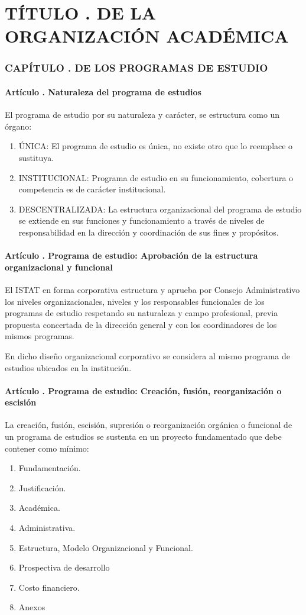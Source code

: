 \part{TÍTULO . DE LA ORGANIZACIÓN ACADÉMICA}
\addtocounter{ns}{1}
\section{CAPÍTULO . DE LOS PROGRAMAS DE ESTUDIO}
\addtocounter{re}{1}
\subsection{Artículo . Naturaleza del programa de estudios}
\addtocounter{ns}{1}
El programa de estudio por su naturaleza y carácter, se estructura como un órgano: 
\begin{enumerate}
\item ÚNICA: El programa de estudio es única, no existe otro que lo reemplace o sustituya. 
\item INSTITUCIONAL: Programa de estudio en su funcionamiento, cobertura o competencia es de carácter institucional. 
\item DESCENTRALIZADA: La estructura organizacional del programa de estudio se extiende en sus funciones y funcionamiento a través de niveles de responsabilidad en la dirección y coordinación de sus fines y propósitos. 
\end{enumerate}
\subsection{Artículo . Programa de estudio: Aprobación de la estructura organizacional y funcional}
\addtocounter{ns}{1}
El ISTAT en forma corporativa estructura y aprueba por Consejo Administrativo los niveles organizacionales, niveles y los responsables funcionales de los programas de estudio respetando su naturaleza y campo profesional, previa propuesta concertada de la dirección general y con los coordinadores de los mismos programas. 

En dicho diseño organizacional corporativo se considera al mismo programa de estudios ubicados en la institución. 
\subsection{Artículo . Programa de estudio: Creación, fusión, reorganización o escisión}
\addtocounter{ns}{1}
La creación, fusión, escisión, supresión o reorganización orgánica o funcional de un programa de estudios se sustenta en un proyecto fundamentado que debe contener como mínimo: 
\begin{enumerate}
\item Fundamentación. 
\item Justificación. 
\item Académica. 
\item Administrativa. 
\item Estructura, Modelo Organizacional y Funcional. 
\item Prospectiva de desarrollo 
\item Costo financiero. 
\item Anexos 
\end{enumerate}
